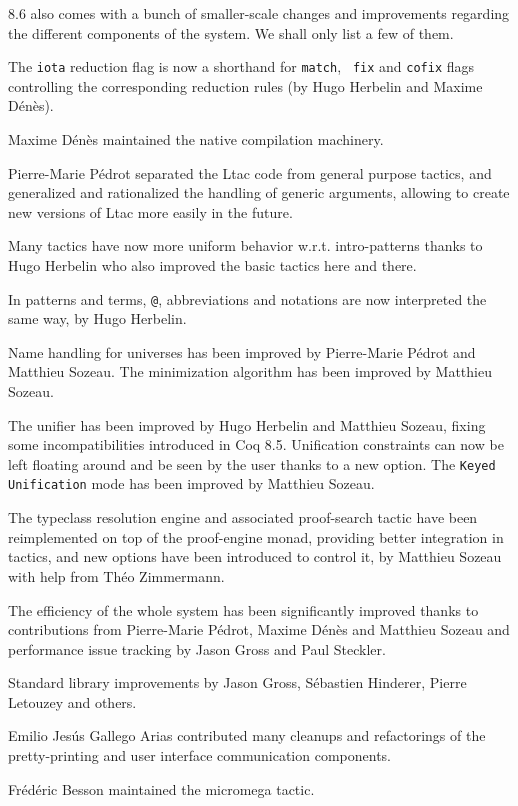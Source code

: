 {\Coq} 8.6 also comes with a bunch of smaller-scale changes and
improvements regarding the different components of the system. We shall
only list a few of them.

The {\tt iota} reduction flag is now a shorthand for {\tt match}, {\tt
  fix} and {\tt cofix} flags controlling the corresponding reduction
rules (by Hugo Herbelin and Maxime Dénès).

Maxime Dénès maintained the native compilation machinery.

Pierre-Marie Pédrot separated the Ltac code from general purpose
tactics, and generalized and rationalized the handling of generic
arguments, allowing to create new versions of Ltac more easily in the
future.

Many tactics have now more uniform behavior w.r.t. intro-patterns thanks
to Hugo Herbelin who also improved the basic tactics here and there.

In patterns and terms, {\tt @}, abbreviations and notations are now
interpreted the same way, by Hugo Herbelin.

Name handling for universes has been improved by Pierre-Marie Pédrot and
Matthieu Sozeau. The minimization algorithm has been improved by
Matthieu Sozeau.

The unifier has been improved by Hugo Herbelin and Matthieu Sozeau,
fixing some incompatibilities introduced in Coq 8.5. Unification
constraints can now be left floating around and be seen by the user
thanks to a new option. The {\tt Keyed Unification} mode has been
improved by Matthieu Sozeau. 

The typeclass resolution engine and associated proof-search tactic have
been reimplemented on top of the proof-engine monad, providing better
integration in tactics, and new options have been introduced to control
it, by Matthieu Sozeau with help from Théo Zimmermann.

The efficiency of the whole system has been significantly improved
thanks to contributions from Pierre-Marie Pédrot, Maxime Dénès and
Matthieu Sozeau and performance issue tracking by Jason Gross and Paul
Steckler.

Standard library improvements by Jason Gross, Sébastien Hinderer, Pierre
Letouzey and others.

Emilio Jesús Gallego Arias contributed many cleanups and refactorings of
the pretty-printing and user interface communication components.

Frédéric Besson maintained the micromega tactic.


